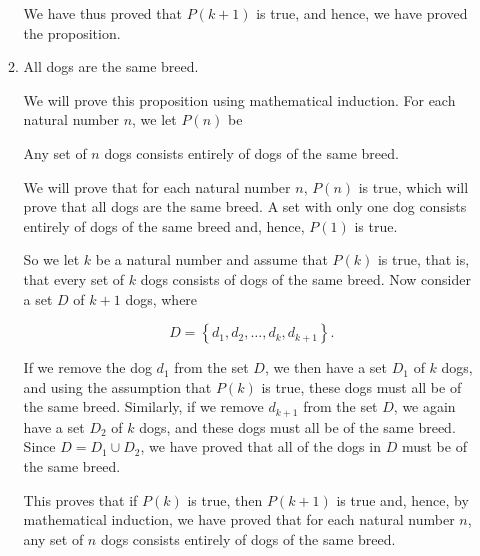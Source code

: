 \begin{enumerate}
\begin{enumerate}
\begin{myproof}
We have thus proved that $P( k + 1 )$ is true, and hence, we have proved the proposition.
\end{myproof}
%
%
%
%
%
%
%
%

\item All dogs are the same breed.

\begin{myproof}
We will prove this proposition using mathematical induction.  For each natural number $n$, we let 
$P( n )$ be

\begin{center}
Any set of $n$ dogs consists entirely of dogs of the same breed.
\end{center}

We will prove that for each natural number $n$, $P( n )$ is true, which will prove that all dogs are the same breed.  A set with only one dog consists entirely of dogs of the same breed and,  hence, $P( 1 )$ is true.

So we let $k$ be a natural number and assume that $P( k )$ is true, that is, that every set of 
$k$ dogs consists of dogs of the same breed.  Now consider a set $D$ of $k + 1$ dogs, where

\[
D = \left\{ d_1, d_2, \ldots, d_k, d_{k+1} \right\}\!.
\]

If we remove the dog $d_1$ from the set $D$, we then have a set $D_1$ of $k$ dogs, and using the assumption that $P( k )$ is true, these dogs must all be of the same breed.  Similarly, if we remove $d_{k+1}$ from the set $D$, we again have a set $D_2$ of $k$ dogs, and these dogs must all be of the same breed.  Since $D = D_1 \cup D_2$, we have proved that all of the dogs in $D$ must be of the same breed.

This proves that if $P( k )$ is true, then $P( k + 1 )$ is true and, hence, by mathematical induction, we have proved that for each natural number $n$, any set of $n$ dogs consists entirely of dogs of the same breed.
\end{myproof}
\end{enumerate}
\end{enumerate}


